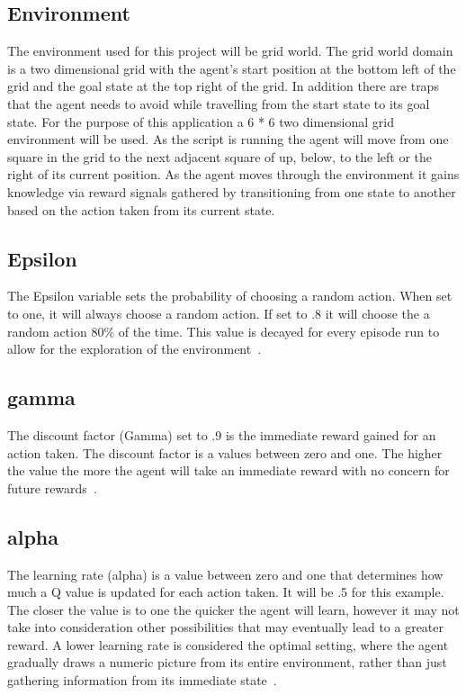 \subsection{Environment}
The environment used for this project will be grid world. The grid world domain is a two dimensional grid with the agent's start position at the bottom left of the grid and the goal state at the top right of the grid. In addition there are traps that the agent needs to avoid while travelling from the start state to its goal state.
For the purpose of this application a  6 * 6 two dimensional grid environment will be used. As the script is running the agent will move from one square in the grid to the next adjacent square of up, below, to the left or the right of its current position. As the agent moves through the environment it gains knowledge via reward signals gathered by transitioning from one state to another based on the action taken from its current state.
\subsection{Epsilon}
The Epsilon variable sets the probability of choosing a random action. When set to one, it will always choose a random action. If set to .8 it will choose the a random action 80\% of the time. This value is decayed for every episode run to allow for the exploration of the environment~\cite{LITTMAN1994157}.
\subsection{gamma}
The discount factor (Gamma) set to .9 is the immediate reward gained for an action taken. The discount factor is a values between zero and one. The higher the value the more the agent will take an immediate reward with no concern for future rewards~\cite{LITTMAN1994157}.
\subsection{alpha}
The learning rate (alpha) is a value between zero and one that determines how much a Q value is updated for each action taken. It will be .5 for this example. The closer the value is to one the quicker the agent will learn, however it may not take into consideration other possibilities that may eventually lead to a greater reward. A lower learning rate is considered the optimal setting, where the agent gradually draws a numeric picture from its entire environment, rather than just gathering information from its immediate state~\cite{LITTMAN1994157}. 
